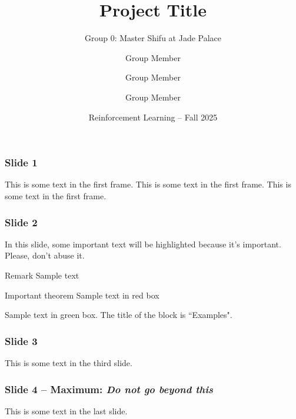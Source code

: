 \documentclass{beamer}
\title[Title]
{Project Title}
\subtitle{Group 0: Master Shifu at Jade Palace}
\author[Group 0: Master Shifu at Jade Palace] 
{Group Member\inst{1} \and Group Member\inst{2} \and Group Member\inst{3}}
\institute[ ] %
{
  \inst{1}%
  Department
  \and
  \inst{2}%
  Department
  \and
   \inst{3}%
  Department
}
\date[RL] %
{Reinforcement Learning -- Fall 2025}
\begin{document}
\frame{\titlepage}


\begin{frame}
\frametitle{Slide 1}
This is some text in the first frame. This is some text in the first frame. This is some text in the first frame.
\end{frame}


\begin{frame}
\frametitle{Slide 2}

In this slide, some important text will be
\alert{highlighted} because it's important.
Please, don't abuse it.

\begin{block}{Remark}
Sample text
\end{block}

\begin{alertblock}{Important theorem}
Sample text in red box
\end{alertblock}

\begin{examples}
Sample text in green box. The title of the block is ``Examples".
\end{examples}
\end{frame}

\begin{frame}
	\frametitle{Slide 3}
	This is some text in the third slide.
\end{frame}

\begin{frame}
	\frametitle{Slide 4 -- Maximum: \textit{Do not go beyond this}}
	This is some text in the last slide.
\end{frame}
\end{document}
